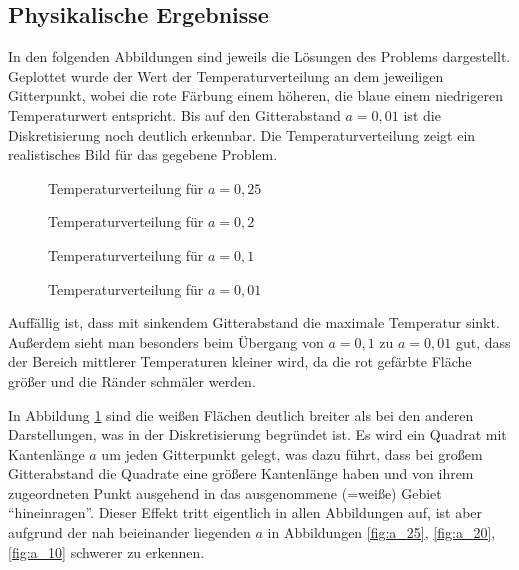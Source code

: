 \documentclass[10pt,a4paper]{article}
\begin{document}
\subsection{Physikalische Ergebnisse}
In den folgenden Abbildungen sind jeweils die Lösungen des Problems dargestellt. Geplottet wurde der Wert der Temperaturverteilung an dem jeweiligen Gitterpunkt, wobei die rote Färbung einem höheren, die blaue einem niedrigeren Temperaturwert entspricht. Bis auf den Gitterabstand $a=0,01$ ist die Diskretisierung noch deutlich erkennbar.
Die Temperaturverteilung zeigt ein realistisches Bild für das gegebene Problem.
\begin{figure}[htbp!]
\begin{minipage}[c]{0.5\linewidth}
\centering
\vspace{-40pt}
\scalebox{0.85}{}
\vspace{-40pt}
\caption{Temperaturverteilung für $a=0,25$}
\label{fig:a_25}
\end{minipage}
\begin{minipage}[c]{0.5\linewidth}
\centering
\vspace{-40pt}
\scalebox{0.85}{}
\vspace{-40pt}
\caption{Temperaturverteilung für $a=0,2$}
\label{fig:a_20}
\end{minipage}
\begin{minipage}[c]{0.5\linewidth}
\centering
\vspace{-40pt}
\scalebox{0.85}{}
\vspace{-40pt}
\caption{Temperaturverteilung für $a=0,1$}
\label{fig:a_10}
\end{minipage}
\begin{minipage}[c]{0.5\linewidth}
\centering
\vspace{-40pt}
\scalebox{0.85}{}
\vspace{-40pt}
\caption{Temperaturverteilung für $a=0,01$}
\label{fig:a_1}
\end{minipage}
\end{figure}
Auffällig ist, dass mit sinkendem Gitterabstand die maximale Temperatur sinkt. Außerdem sieht man besonders beim Übergang von $a=0,1$ zu $a=0,01$ gut, dass der Bereich mittlerer Temperaturen kleiner wird, da die rot gefärbte Fläche größer und die Ränder schmäler werden.

In Abbildung \ref{fig:a_1} sind die weißen Flächen deutlich breiter als bei den anderen Darstellungen, was in der Diskretisierung begründet ist. Es wird ein Quadrat mit Kantenlänge $a$ um jeden Gitterpunkt gelegt, was dazu führt, dass bei großem Gitterabstand die Quadrate eine größere Kantenlänge haben und von ihrem zugeordneten Punkt ausgehend in das ausgenommene (=weiße) Gebiet "`hineinragen"'. Dieser Effekt tritt eigentlich in allen Abbildungen auf, ist aber aufgrund der nah beieinander liegenden $a$ in Abbildungen \ref{fig:a_25}, \ref{fig:a_20}, \ref{fig:a_10} schwerer zu erkennen.
\end{document}
